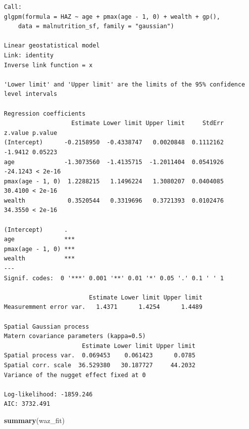 \documentclass[
  letterpaper,
]{krantz}
\newenvironment{Shaded}{\begin{snugshade}}{\end{snugshade}}
\newcommand{\FunctionTok}[1]{\textcolor[rgb]{0.13,0.29,0.53}{\textbf{#1}}}
\newcommand{\NormalTok}[1]{#1}
\begin{document}
\begin{verbatim}
Call:
glgpm(formula = HAZ ~ age + pmax(age - 1, 0) + wealth + gp(), 
    data = malnutrition_sf, family = "gaussian")

Linear geostatistical model
Link: identity 
Inverse link function = x 
 
'Lower limit' and 'Upper limit' are the limits of the 95% confidence level intervals

Regression coefficients
                   Estimate Lower limit Upper limit     StdErr  z.value p.value
(Intercept)      -0.2158950  -0.4338747   0.0020848  0.1112162  -1.9412 0.05223
age              -1.3073560  -1.4135715  -1.2011404  0.0541926 -24.1243 < 2e-16
pmax(age - 1, 0)  1.2288215   1.1496224   1.3080207  0.0404085  30.4100 < 2e-16
wealth            0.3520544   0.3319696   0.3721393  0.0102476  34.3550 < 2e-16
                    
(Intercept)      .  
age              ***
pmax(age - 1, 0) ***
wealth           ***
---
Signif. codes:  0 '***' 0.001 '**' 0.01 '*' 0.05 '.' 0.1 ' ' 1

                        Estimate Lower limit Upper limit
Measuremment error var.   1.4371      1.4254      1.4489

Spatial Gaussian process
Matern covariance parameters (kappa=0.5)
                      Estimate Lower limit Upper limit
Spatial process var.  0.069453    0.061423      0.0785
Spatial corr. scale  36.529380   30.187727     44.2032
Variance of the nugget effect fixed at 0

Log-likelihood: -1859.246
AIC: 3732.491
\end{verbatim}

\begin{Shaded}
\begin{Highlighting}[]
\FunctionTok{summary}\NormalTok{(waz\_fit)}
\end{Highlighting}
\end{Shaded}
\end{document}
